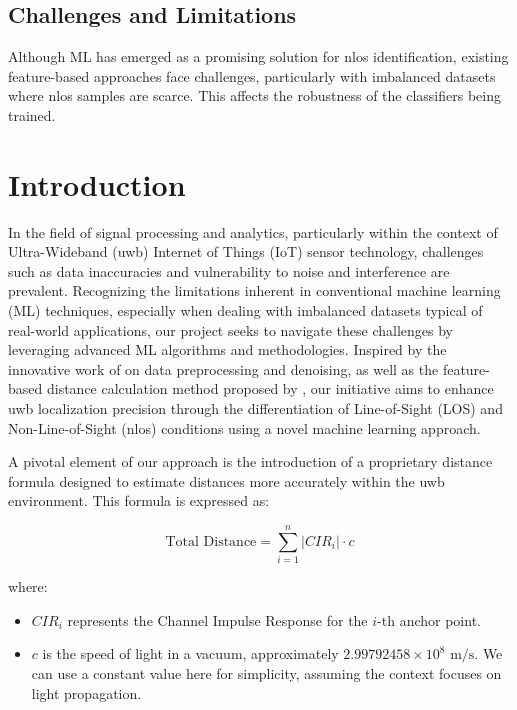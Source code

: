 \subsection{Challenges and Limitations}\label{Challenges and Limitations}
Although ML has emerged as a promising solution for \acrshort{nlos} identification, existing feature-based approaches face challenges, particularly with imbalanced datasets where \acrshort{nlos} samples are scarce. This affects the robustness of the classifiers being trained.


\section{Introduction}\label{introduction}
In the field of signal processing and analytics, particularly within the context of Ultra-Wideband (\acrshort{uwb}) Internet of Things (IoT) sensor technology, challenges such as data inaccuracies and vulnerability to noise and interference are prevalent. Recognizing the limitations inherent in conventional machine learning (ML) techniques, especially when dealing with imbalanced datasets typical of real-world applications, our project seeks to navigate these challenges by leveraging advanced ML algorithms and methodologies. Inspired by the innovative work of \cite{jiang_uwb_2020} on data preprocessing and denoising, as well as the feature-based distance calculation method proposed by \cite{che_feature-based_2022}, our initiative aims to enhance \acrshort{uwb} localization precision through the differentiation of Line-of-Sight (LOS) and Non-Line-of-Sight (\acrshort{nlos}) conditions using a novel machine learning approach.

A pivotal element of our approach is the introduction of a proprietary distance formula designed to estimate distances more accurately within the \acrshort{uwb} environment. This formula is expressed as:

\begin{equation}
\text{Total Distance} = \sum_{i=1}^{n} |CIR_i| \cdot c
\end{equation}

where:

\begin{itemize}
  \item $CIR_i$ represents the Channel Impulse Response for the $i$-th anchor point.
  \item $c$ is the speed of light in a vacuum, approximately $2.99792458 \times 10^8 \text{ m/s}$. We can use a constant value here for simplicity, assuming the context focuses on light propagation.
\end{itemize}

